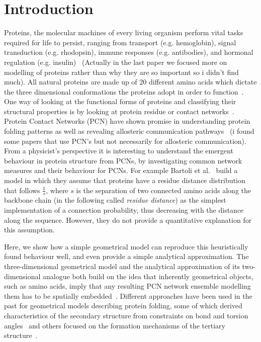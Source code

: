 \documentclass[
reprint,
twocolumn,
amsmath,amssymb,superscriptaddress,aps,
pre]{revtex4-1}
\newcommand{\red}[1]{\textcolor{red!80!black}{#1}}
\begin{document}
\section*{Introduction}
Proteins, the molecular machines of every living organism perform vital tasks required for life to persist, ranging from transport (e.g. hemoglobin), signal transduction (e.g. rhodopsin), immune responses (e.g. antibodies), and hormonal regulation (e.g. insulin)~\cite{dill2008protein,Dill1042} \red{(Actually in the last paper we focused more on modelling of proteins rather than why they are so important so i didn't find much)}. All natural proteins are made up of 20 different amino acids which dictate the three dimensional conformations the proteins adopt in order to function~\cite{scheraga2007protein}. One way of looking at the functional forms of proteins and classifying their structural properties is by looking at protein residue or contact networks~\cite{Vendruscolo2002,DiPaola2013,Estrada2011}. Protein Contact Networks (PCN) have shown promise in understanding protein folding patterns as well as revealing allosteric communication pathways~\cite{yao2019establishing, menichetti2016network,dokholyan2002topological} \red{(i found some papers that use PCN's but not necessarily for allosteric communication)}. 
From a physicist's perspective it is interesting to understand the emergent behaviour in protein structure from PCNs, by investigating common network measures and their behaviour for PCNs. For example Bartoli et al.~\cite{bartoli2008effect} build a model in which they assume that proteins have a residue distance distribution that follows $\frac{1}{s}$, where $s$ is the separation of two connected amino acids along the backbone chain (in the following called \emph{residue distance}) as the simplest implementation of a connection probability, thus decreasing with the distance along the sequence. However, they do not provide a quantitative explanation for this assumption. 

Here, we show how a simple geometrical model can reproduce this heuristically found behaviour well, and even provide a simple analytical approximation. The three-dimensional geometrical model and the analytical approximation of its two-dimensional analogue both build on the idea that inherently geometrical objects, such as amino acids, imply that any resulting PCN network ensemble modelling them has to be spatially embedded~\cite{molkenthin2016scaling, molkenthin2020self}. 
Different approaches have been used in the past for geometrical models describing protein folding, some of which derived characteristics of the secondary structure from constraints on bond and torsion angles~\cite{bhattacharjee2013flory,Danielsson2010,Molkenthin2011} and others focused on the formation mechanisms of the tertiary structure~\cite{molkenthin2016scaling, molkenthin2020self}. 
\end{document}
